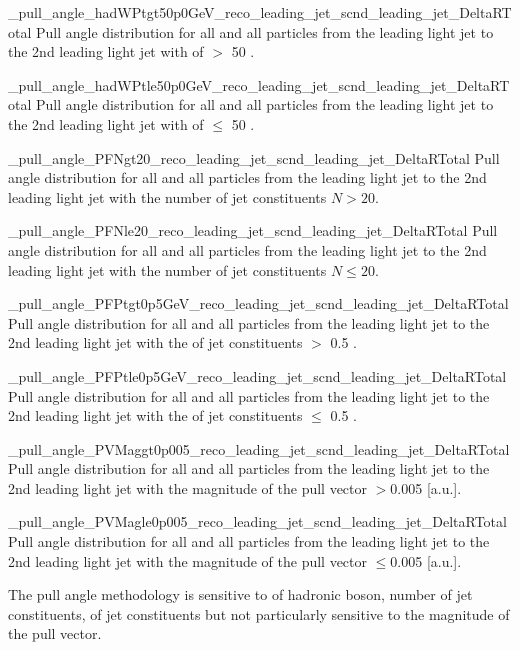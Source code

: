           {_pull_angle_hadWPtgt50p0GeV_reco_leading_jet_scnd_leading_jet_DeltaRTotal}
          {Pull angle distribution for all \DeltaR and all particles from the leading light jet to the 2nd leading light jet with \pt of \PW $>$ 50 \GeV.}
 
          {_pull_angle_hadWPtle50p0GeV_reco_leading_jet_scnd_leading_jet_DeltaRTotal}
          {Pull angle distribution for all \DeltaR and all particles from the leading light jet to the 2nd leading light jet with \pt of \PW $\leq$ 50 \GeV.}
          

          {_pull_angle_PFNgt20_reco_leading_jet_scnd_leading_jet_DeltaRTotal}
          {Pull angle distribution for all \DeltaR and all particles from the leading light jet to the 2nd leading light jet with the number of jet constituents $N>20$.}

          {_pull_angle_PFNle20_reco_leading_jet_scnd_leading_jet_DeltaRTotal}
          {Pull angle distribution for all \DeltaR and all particles from the leading light jet to the 2nd leading light jet with the number of jet constituents $N\leq20$.}

          {_pull_angle_PFPtgt0p5GeV_reco_leading_jet_scnd_leading_jet_DeltaRTotal}
          {Pull angle distribution for all \DeltaR and all particles from the leading light jet to the 2nd leading light jet with the \pt of jet constituents $>$ 0.5 \GeV.}

          {_pull_angle_PFPtle0p5GeV_reco_leading_jet_scnd_leading_jet_DeltaRTotal}
          {Pull angle distribution for all \DeltaR and all particles from the leading light jet to the 2nd leading light jet with the \pt of jet constituents $\leq$ 0.5 \GeV.}

          {_pull_angle_PVMaggt0p005_reco_leading_jet_scnd_leading_jet_DeltaRTotal}
          {Pull angle distribution for all \DeltaR and all particles from the leading light jet to the 2nd leading light jet with the magnitude of the pull vector $> $0.005 [a.u.].}

          {_pull_angle_PVMagle0p005_reco_leading_jet_scnd_leading_jet_DeltaRTotal}
          {Pull angle distribution for all \DeltaR and all particles from the leading light jet to the 2nd leading light jet with the magnitude of the pull vector $\leq $0.005 [a.u.].}

The pull angle methodology is sensitive to \pt of hadronic \PW boson, number of jet constituents, \pt of jet constituents but not particularly sensitive to the magnitude of the pull vector.

